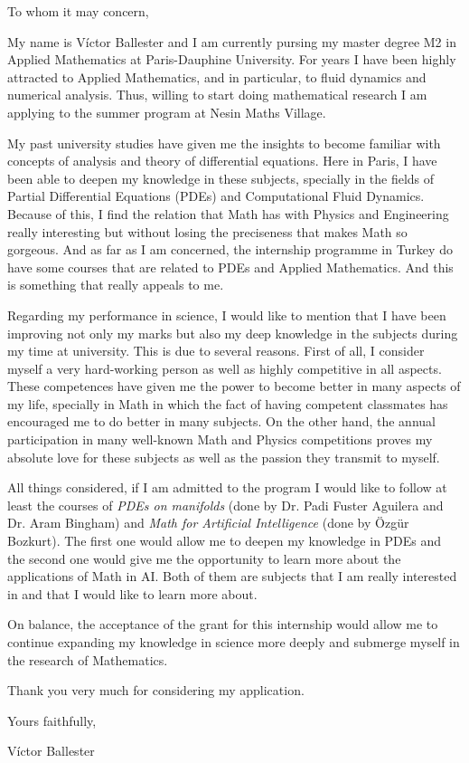 \documentclass{letter}
\date{\today}
\newcommand{\intern}{summer program at Nesin Maths Village}
\begin{document}
\begin{letter}
  \hfill

  \opening{To whom it may concern,} %
  \medskip

  My name is Víctor Ballester and I am currently pursing my master degree M2 in Applied Mathematics at Paris-Dauphine University. For years I have been highly attracted to Applied Mathematics, and in particular, to fluid dynamics and numerical analysis. Thus, willing to start doing mathematical research I am applying to the \intern.

  My past university studies have given me the insights to become familiar with concepts of analysis and theory of differential equations. Here in Paris, I have been able to deepen my knowledge in these subjects, specially in the fields of Partial Differential Equations (PDEs) and Computational Fluid Dynamics. Because of this, I find the relation that Math has with Physics and Engineering really interesting but without losing the preciseness that makes Math so gorgeous. And as far as I am concerned, the internship programme in Turkey do have some courses that are related to PDEs and Applied Mathematics. And this is something that really appeals to me.

  Regarding my performance in science, I would like to mention that I have been improving not only my marks but also my deep knowledge in the subjects during my time at university. This is due to several reasons. First of all, I consider myself a very hard-working person as well as highly competitive in all aspects. These competences have given me the power to become better in many aspects of my life, specially in Math in which the fact of having competent classmates has encouraged me to do better in many subjects. On the other hand, the annual participation in many well-known Math and Physics competitions proves my absolute love for these subjects as well as the passion they transmit to myself.

  All things considered, if I am admitted to the program I would like to follow at least the courses of \textit{PDEs on manifolds} (done by Dr. Padi Fuster Aguilera and Dr. Aram Bingham) and \textit{Math for Artificial Intelligence} (done by Özgür Bozkurt). The first one would allow me to deepen my knowledge in PDEs and the second one would give me the opportunity to learn more about the applications of Math in AI. Both of them are subjects that I am really interested in and that I would like to learn more about.

  On balance, the acceptance of the grant for this internship would allow me to continue expanding my knowledge in science more deeply and submerge myself in the research of Mathematics.

  Thank you very much for considering my application.
  \bigskip

  Yours faithfully,

  Víctor Ballester

\end{letter}
\end{document}
